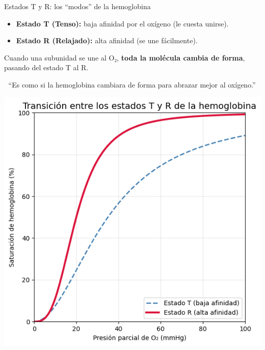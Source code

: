 \documentclass[
  ignorenonframetext,
]{beamer}
\providecommand{\tightlist}{%
  \setlength{\itemsep}{0pt}\setlength{\parskip}{0pt}}
\begin{document}
\begin{frame}{Estados T y R: los ``modos'' de la hemoglobina}
\label{estados-t-y-r-los-modos-de-la-hemoglobina}
\begin{itemize}
\tightlist
\item
  \textbf{Estado T (Tenso):} baja afinidad por el oxígeno (le cuesta
  unirse).\\
\item
  \textbf{Estado R (Relajado):} alta afinidad (se une fácilmente).
\end{itemize}

Cuando una subunidad se une al O₂, \textbf{toda la molécula cambia de
forma}, pasando del estado T al R.

💬 ``Es como si la hemoglobina cambiara de forma para abrazar mejor al
oxígeno.''

\begin{center}
\includegraphics[width=0.3\linewidth,height=\textheight,keepaspectratio]{TR.png}
\end{center}
\end{frame}
\end{document}
